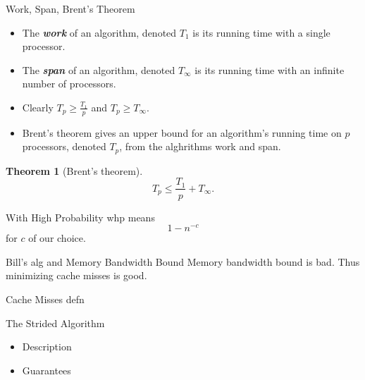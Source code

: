 \documentclass{beamer}
\newcommand{\defn}[1]       {{\textit{\textbf{\boldmath #1}}}}
\newtheorem{thm}{Theorem}
\begin{document}
\begin{frame}[t]{Work, Span, Brent's Theorem}
	\begin{itemize}
		\item The \defn{work} of an algorithm, denoted $T_1$	is its running time with a single processor.
		\item The \defn{span} of an algorithm, denoted $T_\infty$ is its running time with an infinite number of processors.
		\item Clearly $T_p \ge \frac{T_1}{p}$ and $T_p \ge T_\infty$.
		\item Brent's theorem gives an upper bound for an algorithm's running time on $p$ processors, denoted $T_p$, from the alghrithms work and span. 
	\end{itemize}
	\begin{thm}[Brent's theorem]
		$$ T_p \le \frac{T_1}{p} +  T_\infty.$$
	\end{thm}
\end{frame}

\begin{frame}[t]{With High Probability}
	whp means $$1-n^{-c}$$
	for $c$ of our choice.
\end{frame}

\begin{frame}[t]{Bill's alg and Memory Bandwidth Bound}
	Memory bandwidth bound is bad. Thus minimizing cache misses is good.
	
\end{frame}

\begin{frame}[t]{Cache Misses}
	defn
\end{frame}

\begin{frame}[t]{The Strided Algorithm}
	\begin{itemize}
		\item Description
		\item Guarantees
\end{itemize}	
\end{frame}
\end{document}
